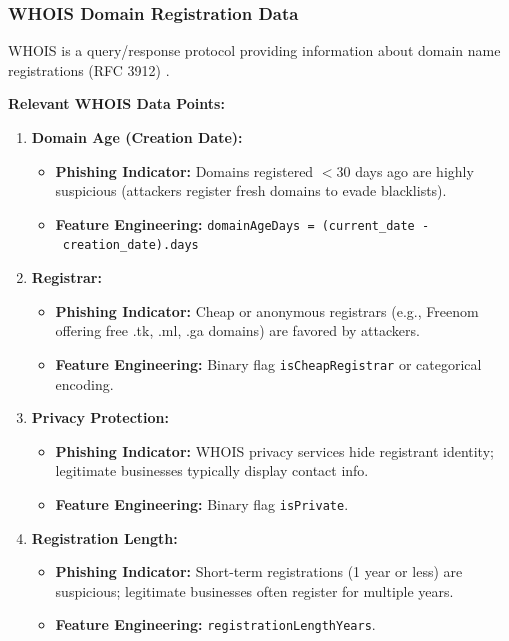 \subsubsection{WHOIS Domain Registration
Data}\label{whois-domain-registration-data}

WHOIS is a query/response protocol providing information about domain
name registrations (RFC 3912) \cite{daigle2004}.

\textbf{Relevant WHOIS Data Points:}

\begin{enumerate}

\item
  \textbf{Domain Age (Creation Date):}

  \begin{itemize}
    \item
    \textbf{Phishing Indicator:} Domains registered $<$30 days ago
    are highly suspicious (attackers register fresh domains to evade
    blacklists).
  \item
    \textbf{Feature Engineering:}
    \texttt{domainAgeDays\ =\ (current\_date\ -\ creation\_date).days}
  \end{itemize}
\item
  \textbf{Registrar:}

  \begin{itemize}
    \item
    \textbf{Phishing Indicator:} Cheap or anonymous registrars (e.g.,
    Freenom offering free .tk, .ml, .ga domains) are favored by
    attackers.
  \item
    \textbf{Feature Engineering:} Binary flag \texttt{isCheapRegistrar}
    or categorical encoding.
  \end{itemize}
\item
  \textbf{Privacy Protection:}

  \begin{itemize}
    \item
    \textbf{Phishing Indicator:} WHOIS privacy services hide registrant
    identity; legitimate businesses typically display contact info.
  \item
    \textbf{Feature Engineering:} Binary flag \texttt{isPrivate}.
  \end{itemize}
\item
  \textbf{Registration Length:}

  \begin{itemize}
    \item
    \textbf{Phishing Indicator:} Short-term registrations (1 year or
    less) are suspicious; legitimate businesses often register for
    multiple years.
  \item
    \textbf{Feature Engineering:} \texttt{registrationLengthYears}.
  \end{itemize}
\end{enumerate}

